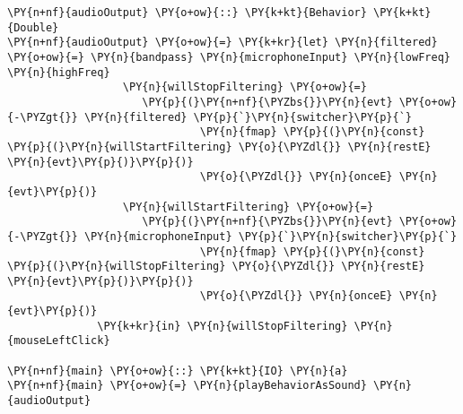 \begin{Verbatim}[commandchars=\\\{\}]
\PY{n+nf}{audioOutput} \PY{o+ow}{::} \PY{k+kt}{Behavior} \PY{k+kt}{Double}
\PY{n+nf}{audioOutput} \PY{o+ow}{=} \PY{k+kr}{let} \PY{n}{filtered} \PY{o+ow}{=} \PY{n}{bandpass} \PY{n}{microphoneInput} \PY{n}{lowFreq} \PY{n}{highFreq}
                  \PY{n}{willStopFiltering} \PY{o+ow}{=} 
                     \PY{p}{(}\PY{n+nf}{\PYZbs{}}\PY{n}{evt} \PY{o+ow}{-\PYZgt{}} \PY{n}{filtered} \PY{p}{`}\PY{n}{switcher}\PY{p}{`} 
                              \PY{n}{fmap} \PY{p}{(}\PY{n}{const} \PY{p}{(}\PY{n}{willStartFiltering} \PY{o}{\PYZdl{}} \PY{n}{restE} \PY{n}{evt}\PY{p}{)}\PY{p}{)} 
                              \PY{o}{\PYZdl{}} \PY{n}{onceE} \PY{n}{evt}\PY{p}{)}
                  \PY{n}{willStartFiltering} \PY{o+ow}{=} 
                     \PY{p}{(}\PY{n+nf}{\PYZbs{}}\PY{n}{evt} \PY{o+ow}{-\PYZgt{}} \PY{n}{microphoneInput} \PY{p}{`}\PY{n}{switcher}\PY{p}{`} 
                              \PY{n}{fmap} \PY{p}{(}\PY{n}{const} \PY{p}{(}\PY{n}{willStopFiltering} \PY{o}{\PYZdl{}} \PY{n}{restE} \PY{n}{evt}\PY{p}{)}\PY{p}{)} 
                              \PY{o}{\PYZdl{}} \PY{n}{onceE} \PY{n}{evt}\PY{p}{)}
              \PY{k+kr}{in} \PY{n}{willStopFiltering} \PY{n}{mouseLeftClick}

\PY{n+nf}{main} \PY{o+ow}{::} \PY{k+kt}{IO} \PY{n}{a}
\PY{n+nf}{main} \PY{o+ow}{=} \PY{n}{playBehaviorAsSound} \PY{n}{audioOutput}
\end{Verbatim}
